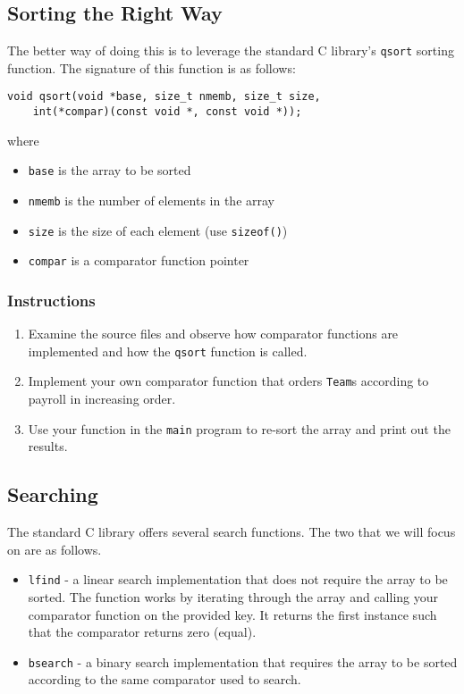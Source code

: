 \documentclass[12pt]{scrartcl}
\begin{document}
\subsection{Sorting the Right Way}

The better way of doing this is to leverage the standard C library's
\texttt{qsort} sorting function.  The signature of this function
is as follows:

\begin{verbatim}
void qsort(void *base, size_t nmemb, size_t size,
	int(*compar)(const void *, const void *));
\end{verbatim}

where
\begin{itemize}
  \item \texttt{base} is the array to be sorted
  \item \texttt{nmemb} is the number of elements in the array
  \item \texttt{size} is the size of each element (use \texttt{sizeof()})
  \item \texttt{compar} is a comparator function pointer
\end{itemize}

\subsubsection*{Instructions}

\begin{enumerate}
  \item Examine the source files and observe how comparator functions
	are implemented and how the \texttt{qsort} function is called.
  \item Implement your own comparator function that orders \texttt{Team}s
	according to payroll in increasing order.
  \item Use your function in the  \texttt{main} program to re-sort the
	array and print out the results.
\end{enumerate}

\subsection{Searching}

The standard C library offers several search functions.  The two that we
will focus on are as follows.
\begin{itemize}
  \item \texttt{lfind} - a linear search implementation that does not
  	require the array to be sorted.  The function works by iterating through
	the array and calling your comparator function on the provided key.
	It returns the first instance such that the comparator returns zero (equal).
  \item \texttt{bsearch} - a binary search implementation that requires
  	the array to be sorted according to the same comparator used to search.
\end{itemize}
\end{document}
